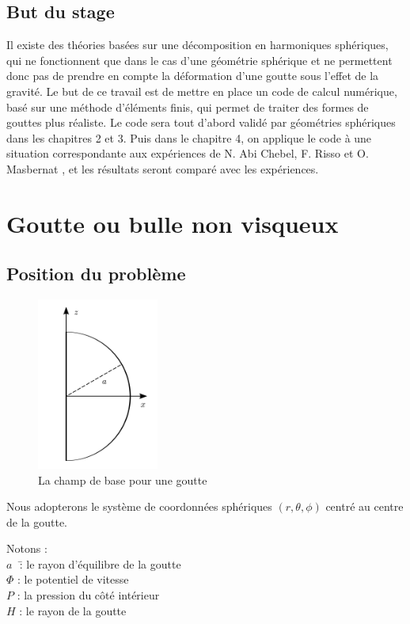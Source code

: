 \documentclass[a4paper]{report}
\begin{document}
\section{But du stage}
Il existe des théories basées sur une décomposition en harmoniques sphériques, qui ne fonctionnent que dans le cas d'une géométrie sphérique et ne permettent donc pas de prendre en compte la déformation d'une goutte sous l'effet de la gravité.
Le but de ce travail est de mettre en place un code de calcul numérique, basé sur une méthode d'éléments finis, qui permet de traiter des formes de gouttes plus réaliste.
Le code sera tout d'abord validé par géométries sphériques dans les chapitres 2 et 3.
Puis dans le chapitre 4, on applique le code à une situation correspondante aux expériences de N. Abi Chebel, F. Risso et O. Masbernat \cite{3}, et les résultats seront comparé avec les expériences.
\chapter{Goutte ou bulle non visqueux}
\section{Position du problème}
\begin{figure}[!htbp]
\centering
\includegraphics[width=4cm]{1.pdf}
\caption{La champ de base pour une goutte}
\end{figure}
Nous adopterons le système de coordonnées sphériques $(r,\theta,\phi)$ centré au centre de la goutte.
\begin{tabbing}
Notons :\\
$a$\,\    \= : le rayon d'équilibre de la goutte\\
$\varPhi$ \> : le potentiel de vitesse\\
$P$       \> : la pression du côté intérieur\\
$H$       \> : le rayon de la goutte
\end{tabbing}
\end{document}
